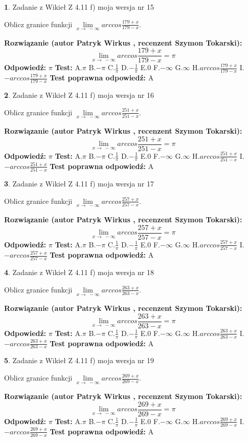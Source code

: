 \documentclass[12pt, a4paper]{article}
\theoremstyle{definition} %
\newtheorem{zad}{}
\newcommand{\zadStart}[1]{\begin{zad}#1\newline}
\newcommand{\zadStop}{\end{zad}}
\newcommand{\rozwStart}[2]{\noindent \textbf{Rozwiązanie (autor #1 , recenzent #2): }\newline}
\newcommand{\rozwStop}{\newline}
\newcommand{\odpStart}{\noindent \textbf{Odpowiedź:}\newline}
\newcommand{\odpStop}{\newline}
\newcommand{\testStart}{\noindent \textbf{Test:}\newline}
\newcommand{\testStop}{\newline}
\newcommand{\kluczStart}{\noindent \textbf{Test poprawna odpowiedź:}\newline}
\newcommand{\kluczStop}{\newline}
\begin{document}
\zadStart{Zadanie z Wikieł Z 4.11 f) moja wersja nr 15}

Oblicz granice funkcji $\lim\limits_{x\to\ -\infty}arccos\frac{179+x}{179-x}$.
\zadStop
\rozwStart{Patryk Wirkus}{Szymon Tokarski}
$$\lim\limits_{x\to\ -\infty}arccos\frac{179+x}{179-x} = \pi$$
\rozwStop
\odpStart
$\pi$
\odpStop
\testStart
A.$\pi$ B.$-\pi$ C.$\frac{1}{\pi}$ D.$-\frac{1}{\pi}$ E.$0$ F.$-\infty$ G.$\infty$ H.$arccos\frac{179+x}{179-x}$ I.$-arccos\frac{179+x}{179-x}$
\testStop
\kluczStart
A
\kluczStop



\zadStart{Zadanie z Wikieł Z 4.11 f) moja wersja nr 16}

Oblicz granice funkcji $\lim\limits_{x\to\ -\infty}arccos\frac{251+x}{251-x}$.
\zadStop
\rozwStart{Patryk Wirkus}{Szymon Tokarski}
$$\lim\limits_{x\to\ -\infty}arccos\frac{251+x}{251-x} = \pi$$
\rozwStop
\odpStart
$\pi$
\odpStop
\testStart
A.$\pi$ B.$-\pi$ C.$\frac{1}{\pi}$ D.$-\frac{1}{\pi}$ E.$0$ F.$-\infty$ G.$\infty$ H.$arccos\frac{251+x}{251-x}$ I.$-arccos\frac{251+x}{251-x}$
\testStop
\kluczStart
A
\kluczStop



\zadStart{Zadanie z Wikieł Z 4.11 f) moja wersja nr 17}

Oblicz granice funkcji $\lim\limits_{x\to\ -\infty}arccos\frac{257+x}{257-x}$.
\zadStop
\rozwStart{Patryk Wirkus}{Szymon Tokarski}
$$\lim\limits_{x\to\ -\infty}arccos\frac{257+x}{257-x} = \pi$$
\rozwStop
\odpStart
$\pi$
\odpStop
\testStart
A.$\pi$ B.$-\pi$ C.$\frac{1}{\pi}$ D.$-\frac{1}{\pi}$ E.$0$ F.$-\infty$ G.$\infty$ H.$arccos\frac{257+x}{257-x}$ I.$-arccos\frac{257+x}{257-x}$
\testStop
\kluczStart
A
\kluczStop



\zadStart{Zadanie z Wikieł Z 4.11 f) moja wersja nr 18}

Oblicz granice funkcji $\lim\limits_{x\to\ -\infty}arccos\frac{263+x}{263-x}$.
\zadStop
\rozwStart{Patryk Wirkus}{Szymon Tokarski}
$$\lim\limits_{x\to\ -\infty}arccos\frac{263+x}{263-x} = \pi$$
\rozwStop
\odpStart
$\pi$
\odpStop
\testStart
A.$\pi$ B.$-\pi$ C.$\frac{1}{\pi}$ D.$-\frac{1}{\pi}$ E.$0$ F.$-\infty$ G.$\infty$ H.$arccos\frac{263+x}{263-x}$ I.$-arccos\frac{263+x}{263-x}$
\testStop
\kluczStart
A
\kluczStop



\zadStart{Zadanie z Wikieł Z 4.11 f) moja wersja nr 19}

Oblicz granice funkcji $\lim\limits_{x\to\ -\infty}arccos\frac{269+x}{269-x}$.
\zadStop
\rozwStart{Patryk Wirkus}{Szymon Tokarski}
$$\lim\limits_{x\to\ -\infty}arccos\frac{269+x}{269-x} = \pi$$
\rozwStop
\odpStart
$\pi$
\odpStop
\testStart
A.$\pi$ B.$-\pi$ C.$\frac{1}{\pi}$ D.$-\frac{1}{\pi}$ E.$0$ F.$-\infty$ G.$\infty$ H.$arccos\frac{269+x}{269-x}$ I.$-arccos\frac{269+x}{269-x}$
\testStop
\kluczStart
A
\kluczStop
\end{document}

